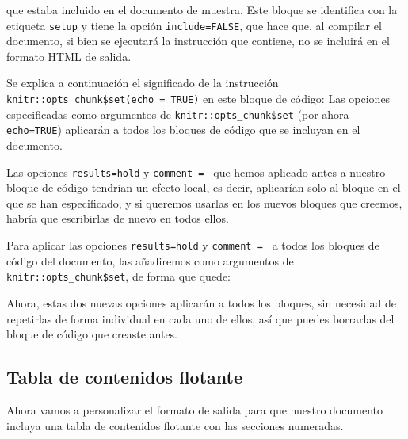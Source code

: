 \documentclass[
  title=normal,
  notoc,
  bib=normal]{mnye}
\newenvironment{Shaded}{\begin{snugshade}}{\end{snugshade}}
\newcommand{\NormalTok}[1]{#1}
\begin{document}
que estaba incluido en el documento de muestra. Este bloque se identifica con la etiqueta \texttt{setup} y tiene la opción \texttt{include=FALSE}, que hace que, al compilar el documento, si bien se ejecutará la instrucción que contiene, no se incluirá en el formato HTML de salida.

Se explica a continuación el significado de la instrucción \texttt{knitr::opts\_chunk\$set(echo\ =\ TRUE)} en este bloque de código: Las opciones especificadas como argumentos de \texttt{knitr::opts\_chunk\$set} (por ahora \texttt{echo=TRUE}) aplicarán a todos los bloques de código que se incluyan en el documento.

Las opciones \texttt{results=\textquotesingle{}hold\textquotesingle{}} y \texttt{comment\ =\ \textquotesingle{}\textquotesingle{}} que hemos aplicado antes a nuestro bloque de código tendrían un efecto local, es decir, aplicarían solo al bloque en el que se han especificado, y si queremos usarlas en los nuevos bloques que creemos, habría que escribirlas de nuevo en todos ellos.

Para aplicar las opciones \texttt{results=\textquotesingle{}hold\textquotesingle{}} y \texttt{comment\ =\ \textquotesingle{}\textquotesingle{}} a todos los bloques de código del documento, las añadiremos como argumentos de \texttt{knitr::opts\_chunk\$set}, de forma que quede:

\begin{Shaded}
\end{Shaded}

Ahora, estas dos nuevas opciones aplicarán a todos los bloques, sin necesidad de repetirlas de forma individual en cada uno de ellos, así que puedes borrarlas del bloque de código que creaste antes.

\hypertarget{tabla-de-contenidos-flotante}{%
\subsection{Tabla de contenidos flotante}\label{tabla-de-contenidos-flotante}}

Ahora vamos a personalizar el formato de salida para que nuestro documento incluya una tabla de contenidos flotante con las secciones numeradas.
\end{document}
